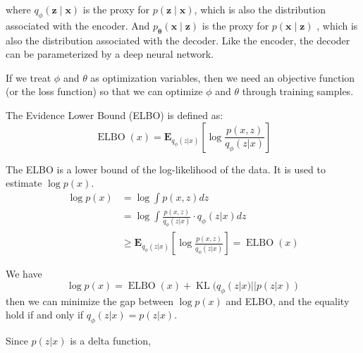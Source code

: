 where $q_{\phi}(\mathbf{z} \mid \mathbf{x})$ is the proxy for  $p(\mathbf{z} \mid \mathbf{x})$, which is also the distribution associated with the encoder.  
And $p_{\boldsymbol{\theta}}(\mathbf{x} \mid \mathbf{z})$ is the proxy for  $p(\mathbf{x} \mid \mathbf{z})$ , which is also the distribution associated with the decoder. 
Like the encoder, the decoder can be parameterized by a deep neural network. 

If we treat $\phi$ and $\theta$ as optimization variables, then we need an objective function (or the loss function) so that we can optimize $\phi$ and $\theta$ through training samples.
\begin{definition}
    The Evidence Lower Bound (ELBO) is defined as:
    \begin{equation}
        \operatorname{ELBO}(x) = \mathbf{E}_{q_\phi(z|x)}\left[\log \frac{p(x, z)}{q_\phi(z|x)}\right]
    \end{equation}
\end{definition}
\begin{remark}
    The ELBO is a lower bound of the log-likelihood of the data. It is used to estimate $\log p(x)$.
    \begin{equation}
        \begin{aligned}
            \log p(x) &= \log \int p(x, z) dz\\
            & = \log \int \frac{p(x, z)}{q_\phi(z|x)} \cdot q_\phi(z|x) dz\\
            & \geq \mathbf{E}_{q_\phi(z|x)}\left[\log \frac{p(x, z)}{q_\phi(z|x)}\right] = \operatorname{ELBO}(x)
        \end{aligned}
    \end{equation}
\end{remark}
\begin{theorem}
    We have 
    \begin{equation}
        \log p(x) =\operatorname{ELBO}(x) + \operatorname{KL}(q_\phi(z|x)||p(z|x))
    \end{equation}
    then we can minimize the gap between $\log p(x)$ and ELBO, and the equality hold if and only if $q_\phi(z|x)=p(z|x)$.

    Since $p(z|x)$ is a delta function, 
\end{theorem}
